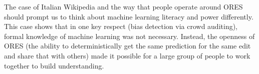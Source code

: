 \documentclass{sigchi-ext}
\begin{document}
The case of Italian Wikipedia and the way that people operate around ORES should prompt us to think about machine learning literacy and power differently.  This case shows that in one key respect (bias detection via crowd auditing), formal knowledge of machine learning was not necessary.  Instead, the openness of ORES (the ability to deterministically get the same prediction for the same edit and share that with others) made it possible for a large group of people to work together to build understanding.

\balance{}



\end{document}
